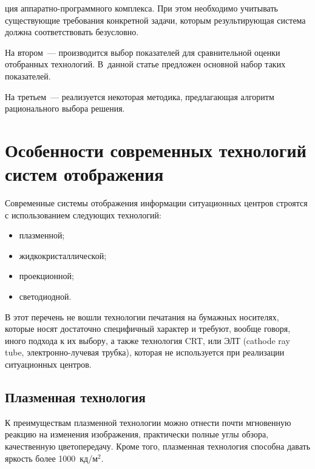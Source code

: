     
     \begin{multicols}{2}
     
\noindent
ция аппаратно-программного комплекса. При этом 
необходимо учитывать существующие требования конкретной задачи, 
которым результирующая сис\-те\-ма должна соответствовать безусловно. 
     
     На втором~--- производится выбор показателей для сравнительной 
оценки отобранных технологий. В~данной статье предложен основной набор 
таких показателей. 
     
     На третьем~--- реализуется некоторая методика, предлагающая
алгоритм рационального выбора решения. 

\section{Особенности современных технологий систем 
отображения}

   Современные системы отображения информации ситуационных центров 
строятся с использованием следующих технологий: 
   \begin{itemize}
\item плазменной; 
\item жидкокристаллической; 
\item проекционной; 
\item светодиодной.
\end{itemize}

   В этот перечень не вошли технологии печатания на бумажных носителях, 
которые носят достаточно специфичный характер и требуют, вообще говоря, 
иного подхода к их выбору, а также технология CRT, или ЭЛТ (cathode ray 
tube, электронно-лучевая трубка), которая не используется при реализации 
ситуационных центров. 

\vspace*{-6pt}
    
\subsection{Плазменная технология} %

\vspace*{-2pt}



     К преимуществам плазменной технологии можно отнести почти 
мгновенную реакцию на изменения изображения, практически полные углы 
обзора, качественную цветопередачу. Кроме того, плазмен\-ная технология 
способна давать яркость более 1000~кд/м$^2$. 
     

\end{multicols}
